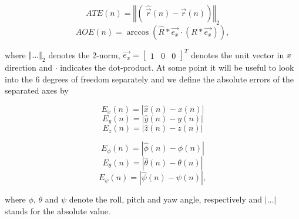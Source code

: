 \begin{equation}
       ATE \left( n \right) = \left\Vert\left(\ \hat{\vec{r}} \left( n \right) - \vec{r} \left( n \right) \right) \right\Vert_2
\end{equation}
\begin{equation}
       AOE \left( n \right) = \arccos \left( \hat{R} *\vec{e_{x}} \cdot\left( R *\vec{e_{x}} \right)\right) ,
\end{equation}

where $\left\Vert \dots \right\Vert_2$ denotes the 2-norm, $\vec{e_{x}} = \left[ \begin{array}{ccc} 1& 0& 0 \end{array} \right]^T$ denotes the unit vector in $x$ direction and $\cdot$ indicates the dot-product. At some point it will be useful to look into the 6 degrees of freedom separately and we define the absolute errors of the separated axes by

\begin{equation}
       E_{x} \left( n \right) = \left| \hat{x} \left( n \right) - x \left( n \right) \right| 
\end{equation}
\begin{equation}
       E_{y} \left( n \right) = \left| \hat{y} \left( n \right) - y \left( n \right) \right|
\end{equation}
\begin{equation}
       E_{z} \left( n \right) = \left| \hat{z} \left( n \right) - z \left( n \right) \right|
\end{equation}

\begin{equation}
	E_{\phi} \left( n \right) = \left| \hat{\phi} \left( n \right) - \phi \left( n \right)\right|
\end{equation}
\begin{equation}
	E_{\theta} \left( n \right) = \left| \hat{\theta} \left( n \right) - \theta \left( n \right)\right|
\end{equation}
\begin{equation}
	E_{\psi} \left( n \right) = \left| \hat{\psi} \left( n \right) - \psi \left( n \right)\right| ,
\end{equation}

where $\phi$, $\theta$ and $\psi$ denote the roll, pitch and yaw angle, respectively and $\left| \dots \right|$ stands for the absolute value.



